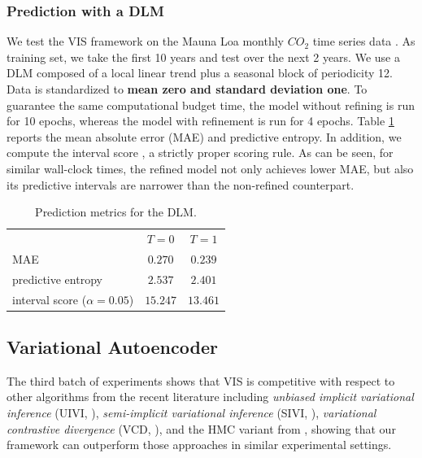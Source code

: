 \subsubsection{Prediction with a DLM}

We test the VIS framework on the Mauna Loa monthly $CO_2$ time series data \cite{keeling2005atmospheric}. As training set, we take the first 10 years and test  over the next 2 years. We use a DLM composed of a local linear trend plus a seasonal block of periodicity 12. %
Data is standardized %
to {\bf mean zero and standard deviation one}. To guarantee the same computational budget time, the model without refining is run for 10 epochs, whereas the model with refinement is run for 4 epochs.  Table \ref{tbl:preds_dlm}
reports the mean absolute error (MAE) and predictive entropy. 
In addition, we compute the interval score 
 \cite{gneiting2007strictly}, a strictly proper scoring rule. As can be seen, for similar wall-clock times, the refined model not only achieves lower MAE, but also its predictive intervals are narrower than the non-refined counterpart. 

\begin{table}[!ht]
\centering
\caption{Prediction metrics for the DLM.}\label{tbl:preds_dlm}
\begin{tabular}{lcc}
\cline{1-3}
   & $T=0$                             & $T=1$   \\ 
 \cline{1-3}
    MAE          & $0.270$ &  $\bm{0.239}$ \\
    predictive entropy          & $2.537$ &  $\bm{2.401}$ \\
    interval score ($\alpha=0.05$) & $15.247$ & $\bm{13.461}$\\
 \cline{1-3}
\end{tabular}
\end{table}

\subsection{Variational Autoencoder}

The third batch of experiments shows that VIS 
is competitive with respect to other algorithms from the recent literature including \emph{unbiased implicit variational inference} (UIVI,  \cite{pmlr-v89-titsias19a}), \emph{semi-implicit variational inference} (SIVI, \cite{yin2018semi}),  \emph{variational contrastive divergence} (VCD,  \cite{pmlr-v97-ruiz19a}), 
and the HMC variant from \cite{hoffman2017learning}, showing that our framework can outperform those approaches in similar experimental settings. 

